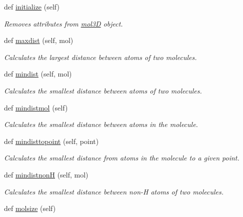 \begin{DoxyCompactItemize}
def \hyperlink{classmolSimplify_1_1Classes_1_1mol3D_1_1mol3D_ab2935f2310ca23b0c77e4ef3ac11a6f9}{initialize} (self)
\begin{DoxyCompactList}\small\item\em Removes attributes from \hyperlink{classmolSimplify_1_1Classes_1_1mol3D_1_1mol3D}{mol3D} object. \end{DoxyCompactList}\item 
def \hyperlink{classmolSimplify_1_1Classes_1_1mol3D_1_1mol3D_a7d3399262fb568aeec589f86ff59d376}{maxdist} (self, mol)
\begin{DoxyCompactList}\small\item\em Calculates the largest distance between atoms of two molecules. \end{DoxyCompactList}\item 
def \hyperlink{classmolSimplify_1_1Classes_1_1mol3D_1_1mol3D_ab051fea5908eab8ddcd39d4ea4688657}{mindist} (self, mol)
\begin{DoxyCompactList}\small\item\em Calculates the smallest distance between atoms of two molecules. \end{DoxyCompactList}\item 
def \hyperlink{classmolSimplify_1_1Classes_1_1mol3D_1_1mol3D_abc383cd8e5f7a2963b5b220fe5f23c02}{mindistmol} (self)
\begin{DoxyCompactList}\small\item\em Calculates the smallest distance between atoms in the molecule. \end{DoxyCompactList}\item 
def \hyperlink{classmolSimplify_1_1Classes_1_1mol3D_1_1mol3D_a9002b30e6f3e13fb41c0080f4fec6ce1}{mindisttopoint} (self, point)
\begin{DoxyCompactList}\small\item\em Calculates the smallest distance from atoms in the molecule to a given point. \end{DoxyCompactList}\item 
def \hyperlink{classmolSimplify_1_1Classes_1_1mol3D_1_1mol3D_a613d343492efdeda0c47700654157b3d}{mindistnonH} (self, mol)
\begin{DoxyCompactList}\small\item\em Calculates the smallest distance between non-\/H atoms of two molecules. \end{DoxyCompactList}\item 
def \hyperlink{classmolSimplify_1_1Classes_1_1mol3D_1_1mol3D_aec0cabe05c899a3825c523add5e352ce}{molsize} (self)

\end{DoxyCompactItemize}
